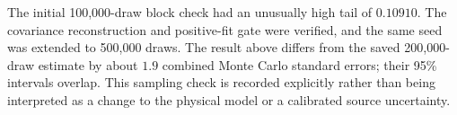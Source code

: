 The initial 100,000-draw block check had an unusually high tail of $0.10910$.
The covariance reconstruction and positive-fit gate were verified, and the
same seed was extended to 500,000 draws. The result above differs from the saved
200,000-draw estimate by about $1.9$ combined Monte Carlo standard errors; their
95\% intervals overlap. This sampling check is recorded explicitly rather than
being interpreted as a change to the physical model or a calibrated source
uncertainty.
